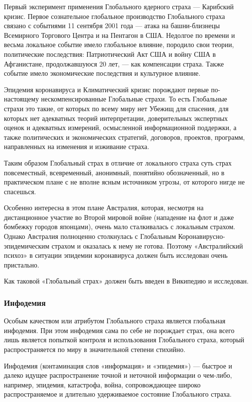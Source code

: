 Первый эксперимент применения Глобального ядерного страха — Карибский кризис.
Первое сознательное глобальное производство Глобального страха связано с
событиями 11 сентября 2001 года — атака на башни-близнецы Всемирного Торгового
Центра и на Пентагон в США. Недолгое по времени и весьма локальное событие
имело глобальное влияние, породило свои теории, политические последствия:
Патриотический Акт США и войну США в Афганистане, продолжавшуюся 20 лет, — как
компенсации страха. Также событие имело экономические последствия и культурное
влияние.

Эпидемия коронавируса и Климатический кризис порождают первые по-настоящему
нескомпенсированные Глобальные страхи. То есть Глобальные страхи это такие, от
которых по всему миру нет Убежищ для спасения, для которых нет адекватных
теорий интерпретации, доверительных экспертных оценок и адекватных измерений,
осмысленной информационной поддержки, а также политических и экономических
стратегий, договоров, проектов, программ, направленных на изменения и изживание
страха.

Таким образом Глобальный страх в отличие от локального страха суть страх
повсеместный, всевременный, анонимный, понятийно обозначенный, но в
практическом плане с не вполне ясным источником угрозы, от которого нигде не
спасешься.

Особенно интересна в этом плане Австралия, которая, несмотря на дистанционное
участие во Второй мировой войне (нападение на флот и даже бомбежку городов
японцами), очень мало сталкивалась с локальным страхом. Однако Австралия
полноценно столкнулась с Глобальным Коронавирусно-эпидемическим страхом и
оказалась к нему не готова. Поэтому «Австралийский психоз» в ситуации эпидемии
коронавируса должен быть исследован очень пристально.

Как таковой «Глобальный страх» должен быть введен в Википедию и исследован.

\subsubsection{Инфодемия}

Особым качеством или атрибутом Глобального страха является глобальная
инфодемия. При этом инфодемия сама по себе не порождает страх, она всего лишь
является попыткой контроля и использования Глобального страха, который
распространяется по миру в значительной степени стихийно.

Инфодемия (контаминация слов «информация» и «эпидемия») — быстрое и далеко
идущее распространение точной и неточной информации о чем-либо, например,
эпидемия, катастрофа, война, сопровождающее широко распространяемое и длительно
удерживаемое состояние Глобального страха.

